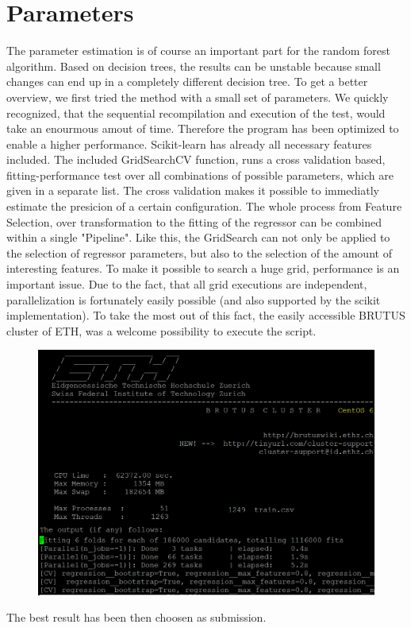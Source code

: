 \documentclass[a4paper, 11pt]{article}
\begin{document}
\section{Parameters}
The parameter estimation is of course an important part for the random forest algorithm. Based on decision trees, the results can be unstable because small changes can end up in a completely different decision tree. To get a better overview, we first tried the method with a small set of parameters. We quickly recognized, that the sequential recompilation and execution of the test, would take an enourmous amout of time. Therefore the program has been optimized to enable a higher performance.
Scikit-learn has already all necessary features included. The included GridSearchCV function, runs a cross validation based, fitting-performance test over all combinations of possible parameters, which are given in a separate list. The cross validation makes it possible to immediatly estimate the presicion of a certain configuration. The whole process from Feature Selection, over transformation to the fitting of the regressor can be combined within a single "Pipeline". Like this, the GridSearch can not only be applied to the selection of regressor parameters, but also to the selection of the amount of interesting features.
To make it possible to search a huge grid, performance is an important issue. Due to the fact, that all grid executions are independent, parallelization is fortunately easily possible (and also supported by the scikit implementation). To take the most out of this fact, the easily accessible BRUTUS cluster of ETH, was a welcome possibility to execute the script.
\begin{figure}	
	\centering
	\includegraphics[scale=0.6]{ScreenshotCluster.png}
\end{figure}
The best result has been then choosen as submission.
\end{document}
